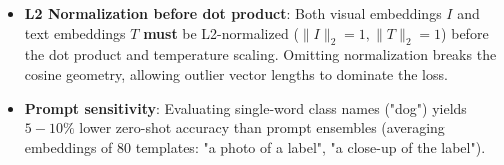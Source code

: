 \begin{trap}
\begin{itemize}
\item \textbf{L2 Normalization before dot product}: Both visual embeddings $I$ and text embeddings $T$ \textbf{must} be L2-normalized ($\|I\|_2 = 1, \|T\|_2 = 1$) before the dot product and temperature scaling. Omitting normalization breaks the cosine geometry, allowing outlier vector lengths to dominate the loss.
\item \textbf{Prompt sensitivity}: Evaluating single-word class names ("dog") yields $5-10\%$ lower zero-shot accuracy than prompt ensembles (averaging embeddings of 80 templates: "a photo of a {label}", "a close-up of the {label}").
\end{itemize}
\end{trap}
